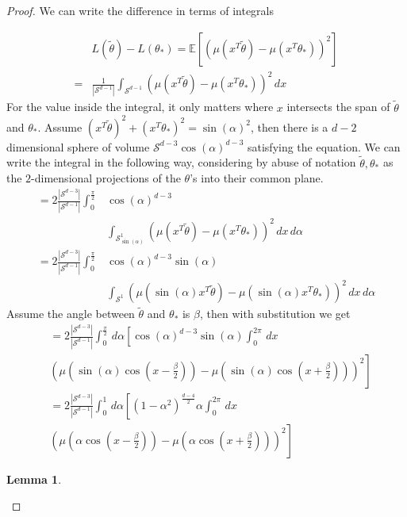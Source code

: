 \documentclass[twoside]{article} \usepackage{aistats2017}
\newcommand{\EV}[1] {
  \mathbb{E}\left[#1\right]}
\newtheorem{lemma}[theorem]{Lemma}
\begin{document}
\begin{proof}
We can write the difference in terms of integrals

\begin{align*}
    &L(\tilde{\theta})-L(\theta_*)=\EV{(\mu(x^T\tilde{\theta})-\mu(x^T\theta_*))^2}\\
    =&\frac{1}{|\mathcal{S}^{d-1}|}\int_{\mathcal{S}^{d-1}}\left(\mu(x^T\tilde{\theta})-\mu(x^T\theta_*)\right)^2\, dx
\end{align*}
For the value inside the integral, it only matters where $x$ intersects the span of $\tilde{\theta}$ and $\theta_*$. Assume $(x^T\tilde{\theta})^2+(x^T\theta_*)^2 = \sin(\alpha)^2$, then there is a $d-2$ dimensional sphere of volume $\mathcal{S}^{d-3}\cos(\alpha)^{d-3}$ satisfying the equation. We can write the integral in the following way, considering by abuse of notation $\tilde{\theta},\theta_*$ as the $2$-dimensional projections of the $\theta$'s into their common plane.
\begin{align*}
    =2\frac{|\mathcal{S}^{d-3}|}{|\mathcal{S}^{d-1}|}\int_{0}^{\frac{\pi}{2}}&\cos(\alpha)^{d-3}\\
    &\int_{\mathcal{S}^1_{\sin(\alpha)}}\left(\mu(x^T\tilde{\theta})-\mu(x^T\theta_*)\right)^2\, dx\,d\alpha\nonumber\\
    =2\frac{|\mathcal{S}^{d-3}|}{|\mathcal{S}^{d-1}|}\int_{0}^{\frac{\pi}{2}}&\cos(\alpha)^{d-3}\sin(\alpha)\nonumber\\
    &\int_{\mathcal{S}^1}\left(\mu(\sin(\alpha)x^T\tilde{\theta})-\mu(\sin(\alpha)x^T\theta_*)\right)^2\, dx\,d\alpha\nonumber
\end{align*}    
    Assume the angle between $\tilde{\theta}$ and $\theta_*$ is $\beta$, then with substitution we get
    \begin{align}
        &=2\frac{|\mathcal{S}^{d-3}|}{|\mathcal{S}^{d-1}|}\int_{0}^{\frac{\pi}{2}}\,d\alpha\left[\cos(\alpha)^{d-3}\sin(\alpha)\int_{0}^{2\pi}\, dx\right.\nonumber\\
    &\left.\left(\mu(\sin(\alpha)\cos(x-\frac{\beta}{2}))-\mu(\sin(\alpha)\cos(x+\frac{\beta}{2}))\right)^2\right]\nonumber\\
        &=2\frac{|\mathcal{S}^{d-3}|}{|\mathcal{S}^{d-1}|}\int_{0}^{1}\,d\alpha\left[(1-\alpha^2)^{\frac{d-4}{2}}\alpha\int_{0}^{2\pi}\, dx\right.\nonumber\\
    &\left.\left(\mu(\alpha\cos(x-\frac{\beta}{2}))-\mu(\alpha \cos(x+\frac{\beta}{2}))\right)^2\right]\label{dbound}
    \end{align}
    \begin{lemma}\label{convexbound}

\end{lemma}
\end{proof}
\end{document}

